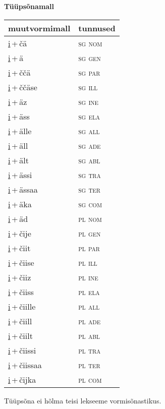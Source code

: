 
\vspace{1.8em}
\begin{minipage}{\textwidth}
\textbf{Tüüpsõnamall \,}\\

\begin{sideways}
\begin{tabular}{l l}
muutvormimall & tunnused \\
\hline
\underline{i}\,+\,čä & \textsc{ sg nom } \\
\underline{i}\,+\,ä & \textsc{ sg gen } \\
\underline{i}\,+\,ččä & \textsc{ sg par } \\
\underline{i}\,+\,ččäse & \textsc{ sg ill } \\
\underline{i}\,+\,äz & \textsc{ sg ine } \\
\underline{i}\,+\,äss & \textsc{ sg ela } \\
\underline{i}\,+\,älle & \textsc{ sg all } \\
\underline{i}\,+\,äll & \textsc{ sg ade } \\
\underline{i}\,+\,ält & \textsc{ sg abl } \\
\underline{i}\,+\,ässi & \textsc{ sg tra } \\
\underline{i}\,+\,ässaa & \textsc{ sg ter } \\
\underline{i}\,+\,äka & \textsc{ sg com } \\
\underline{i}\,+\,äd & \textsc{ pl nom } \\
\underline{i}\,+\,čije & \textsc{ pl gen } \\
\underline{i}\,+\,čiit & \textsc{ pl par } \\
\underline{i}\,+\,čiise & \textsc{ pl ill } \\
\underline{i}\,+\,čiiz & \textsc{ pl ine } \\
\underline{i}\,+\,čiiss & \textsc{ pl ela } \\
\underline{i}\,+\,čiille & \textsc{ pl all } \\
\underline{i}\,+\,čiill & \textsc{ pl ade } \\
\underline{i}\,+\,čiilt & \textsc{ pl abl } \\
\underline{i}\,+\,čiissi & \textsc{ pl tra } \\
\underline{i}\,+\,čiissaa & \textsc{ pl ter } \\
\underline{i}\,+\,čijka & \textsc{ pl com } \\
\end{tabular}
\end{sideways}
\label{tab:tüüpsõnamall-ičä}

\end{minipage}

 
\vspace{1em}
\noindent Tüüpsõna ei hõlma teisi lekseeme vormi\-sõnastikus.
